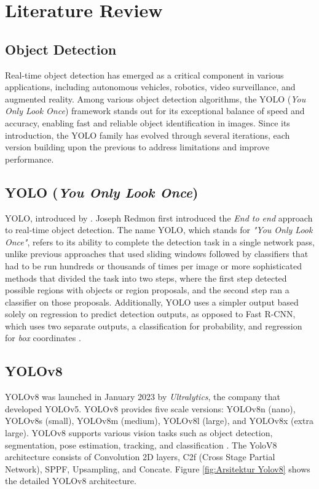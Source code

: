 \section{Literature Review}
\label{sec:literaturereview}

\subsection{Object Detection}
Real-time object detection has emerged as a critical component in various applications, including autonomous vehicles, robotics, video surveillance, and augmented reality. Among various object detection algorithms, the YOLO (\emph{You Only Look Once}) framework stands out for its exceptional balance of speed and accuracy, enabling fast and reliable object identification in images. Since its introduction, the YOLO family has evolved through several iterations, each version building upon the previous to address limitations and improve performance.

\subsection{YOLO (\emph{You Only Look Once})}
YOLO, introduced by \cite{YOLO}. Joseph Redmon first introduced the \emph{End to end} approach to real-time object detection. The name YOLO, which stands for \emph{"You Only Look Once"}, refers to its ability to complete the detection task in a single network pass, unlike previous approaches that used sliding windows followed by classifiers that had to be run hundreds or thousands of times per image or more sophisticated methods that divided the task into two steps, where the first step detected possible regions with objects or region proposals, and the second step ran a classifier on those proposals. Additionally, YOLO uses a simpler output based solely on regression to predict detection outputs, as opposed to Fast R-CNN, which uses two separate outputs, a classification for probability, and regression for \emph{box} coordinates \cite{YOLO}.

\subsection{YOLOv8}
YOLOv8 was launched in January 2023 by \emph{Ultralytics}, the company that developed YOLOv5. YOLOv8 provides five scale versions: YOLOv8n (nano), YOLOv8s (small), YOLOv8m (medium), YOLOv8l (large), and YOLOv8x (extra large). YOLOv8 supports various vision tasks such as object detection, segmentation, pose estimation, tracking, and classification \cite{Yolov8}. The YoloV8 architecture consists of Convolution 2D layers, C2f (Cross Stage Partial Network), SPPF, Upsampling, and Concate. Figure \ref{fig:Arsitektur Yolov8} shows the detailed YOLOv8 architecture.

